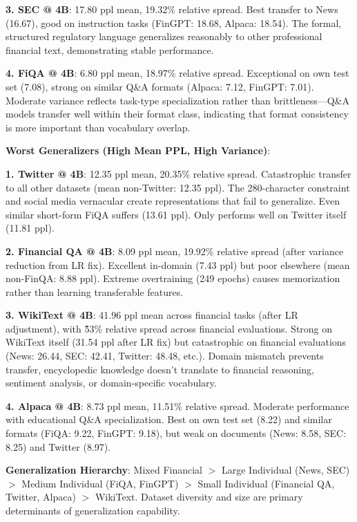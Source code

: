 \textbf{3. SEC @ 4B}: 17.80 ppl mean, 19.32\% relative spread. Best transfer to News (16.67), good on instruction tasks (FinGPT: 18.68, Alpaca: 18.54). The formal, structured regulatory language generalizes reasonably to other professional financial text, demonstrating stable performance.

\textbf{4. FiQA @ 4B}: 6.80 ppl mean, 18.97\% relative spread. Exceptional on own test set (7.08), strong on similar Q\&A formats (Alpaca: 7.12, FinGPT: 7.01). Moderate variance reflects task-type specialization rather than brittleness—Q\&A models transfer well within their format class, indicating that format consistency is more important than vocabulary overlap.

\textbf{Worst Generalizers (High Mean PPL, High Variance)}:

\textbf{1. Twitter @ 4B}: 12.35 ppl mean, 20.35\% relative spread. Catastrophic transfer to all other datasets (mean non-Twitter: 12.35 ppl). The 280-character constraint and social media vernacular create representations that fail to generalize. Even similar short-form FiQA suffers (13.61 ppl). Only performs well on Twitter itself (11.81 ppl).

\textbf{2. Financial QA @ 4B}: 8.09 ppl mean, 19.92\% relative spread (after variance reduction from LR fix). Excellent in-domain (7.43 ppl) but poor elsewhere (mean non-FinQA: 8.88 ppl). Extreme overtraining (249 epochs) causes memorization rather than learning transferable features.

\textbf{3. WikiText @ 4B}: 41.96 ppl mean across financial tasks (after LR adjustment), with \~53\% relative spread across financial evaluations. Strong on WikiText itself (31.54 ppl after LR fix) but catastrophic on financial evaluations (News: 26.44, SEC: 42.41, Twitter: 48.48, etc.). Domain mismatch prevents transfer, encyclopedic knowledge doesn't translate to financial reasoning, sentiment analysis, or domain-specific vocabulary.

\textbf{4. Alpaca @ 4B}: 8.73 ppl mean, 11.51\% relative spread. Moderate performance with educational Q\&A specialization. Best on own test set (8.22) and similar formats (FiQA: 9.22, FinGPT: 9.18), but weak on documents (News: 8.58, SEC: 8.25) and Twitter (8.97).

\textbf{Generalization Hierarchy}: Mixed Financial $>$ Large Individual (News, SEC) $>$ Medium Individual (FiQA, FinGPT) $>$ Small Individual (Financial QA, Twitter, Alpaca) $>$ WikiText. Dataset diversity and size are primary determinants of generalization capability.

